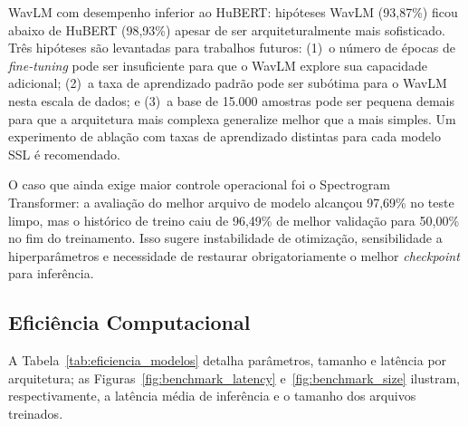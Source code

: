 \documentclass[12pt,a4paper]{article}
\begin{document}
\begin{warningbox}{WavLM com desempenho inferior ao HuBERT: hipóteses}
WavLM (93,87\%) ficou abaixo de HuBERT (98,93\%) apesar de ser
arquiteturalmente mais sofisticado. Três hipóteses são levantadas para
trabalhos futuros: (1)~o número de épocas de \textit{fine-tuning} pode ser
insuficiente para que o WavLM explore sua capacidade adicional; (2)~a taxa de
aprendizado padrão pode ser subótima para o WavLM nesta escala de dados; e
(3)~a base de 15.000 amostras pode ser pequena demais para que a arquitetura
mais complexa generalize melhor que a mais simples. Um experimento de ablação
com taxas de aprendizado distintas para cada modelo SSL é recomendado.
\end{warningbox}

O caso que ainda exige maior controle operacional foi o Spectrogram
Transformer: a avaliação do melhor arquivo de modelo alcançou 97,69\% no teste limpo,
mas o histórico de treino caiu de 96,49\% de melhor validação para 50,00\%
no fim do treinamento. Isso sugere instabilidade de otimização, sensibilidade
a hiperparâmetros e necessidade de restaurar obrigatoriamente o melhor
\textit{checkpoint} para inferência.

\subsection{Eficiência Computacional}

A Tabela~\ref{tab:eficiencia_modelos} detalha parâmetros, tamanho e latência por
arquitetura; as Figuras~\ref{fig:benchmark_latency} e~\ref{fig:benchmark_size}
ilustram, respectivamente, a latência média de inferência e o tamanho dos
arquivos treinados.
\end{document}
